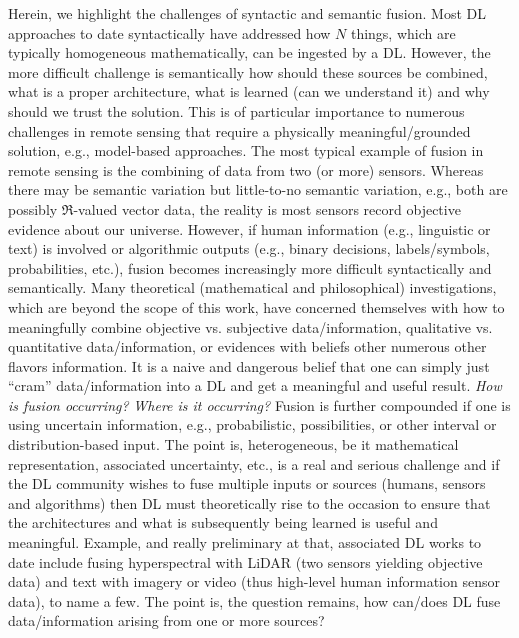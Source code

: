 \documentclass[12pt]{spieman}
\begin{document}
\begin{spacing}{1}
Herein, we highlight the challenges of syntactic and semantic fusion. Most DL approaches to date syntactically have addressed how $N$ things, which are typically homogeneous mathematically, can be ingested by a DL. However, the more difficult challenge is semantically how should these sources be combined, what is a proper architecture, what is learned (can we understand it) and why should we trust the solution. This is of particular importance to numerous challenges in remote sensing that require a physically meaningful/grounded solution, e.g., model-based approaches. The most typical example of fusion in remote sensing is the combining of data from two (or more) sensors. Whereas there may be semantic variation but little-to-no semantic variation, e.g., both are possibly $\Re$-valued vector data, the reality is most sensors record objective evidence about our universe. However, if human information (e.g., linguistic or text) is involved or algorithmic outputs (e.g., binary decisions, labels/symbols, probabilities, etc.), fusion becomes increasingly more difficult syntactically and semantically. Many theoretical (mathematical and philosophical) investigations, which are beyond the scope of this work, have concerned themselves with how to meaningfully combine objective vs. subjective data/information, qualitative vs. quantitative data/information, or evidences with beliefs other numerous other flavors information. It is a naive and dangerous belief that one can simply just ``cram'' data/information into a DL and get a meaningful and useful result. \textit{How is fusion occurring?} \textit{Where is it occurring?} Fusion is further compounded if one is using uncertain information, e.g., probabilistic, possibilities, or other interval or distribution-based input. The point is, heterogeneous, be it mathematical representation, associated uncertainty, etc., is a real and serious challenge and if the DL community wishes to fuse multiple inputs or sources (humans, sensors and algorithms) then DL must theoretically rise to the occasion to ensure that the architectures and what is subsequently being learned is useful and meaningful. Example, and really preliminary at that, associated DL works to date include fusing hyperspectral with LiDAR \cite{7786851} (two sensors yielding objective data) and text with imagery or video \cite{conficmlNgiamKKNLN11} (thus high-level human information sensor data), to name a few. The point is, the question remains, how can/does DL fuse data/information arising from one or more sources?

%
%

\end{spacing}
\end{document}
